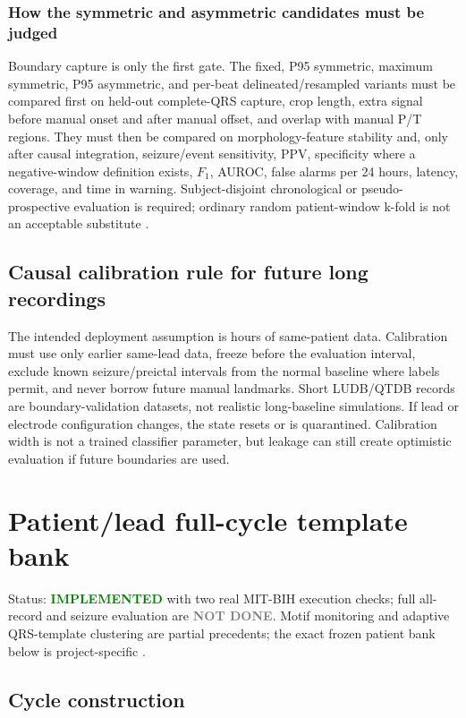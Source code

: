 \documentclass[11pt,a4paper]{article}
\newcommand{\implemented}{\textcolor{green}{\textbf{IMPLEMENTED}}}
\newcommand{\notdone}{\textcolor{gray}{\textbf{NOT DONE}}}
\begin{document}
\subsubsection{How the symmetric and asymmetric candidates must be judged}

Boundary capture is only the first gate. The fixed, P95 symmetric, maximum
symmetric, P95 asymmetric, and per-beat delineated/resampled variants must be
compared first on held-out complete-QRS capture, crop length, extra signal
before manual onset and after manual offset, and overlap with manual P/T
regions. They must then be compared on morphology-feature stability and, only
after causal integration, seizure/event sensitivity, PPV, specificity where a
negative-window definition exists, $F_1$, AUROC, false alarms per 24 hours,
latency, coverage, and time in warning. Subject-disjoint chronological or
pseudo-prospective evaluation is required; ordinary random patient-window
k-fold is not an acceptable substitute \cite{kalousios,seizeit22025}.

\subsection{Causal calibration rule for future long recordings}

The intended deployment assumption is hours of same-patient data. Calibration must use only earlier same-lead data, freeze before the evaluation interval, exclude known seizure/preictal intervals from the normal baseline where labels permit, and never borrow future manual landmarks. Short LUDB/QTDB records are boundary-validation datasets, not realistic long-baseline simulations. If lead or electrode configuration changes, the state resets or is quarantined. Calibration width is not a trained classifier parameter, but leakage can still create optimistic evaluation if future boundaries are used.

\section{Patient/lead full-cycle template bank}
\label{sec:template}

Status: \implemented{} with two real MIT-BIH execution checks; full all-record and seizure evaluation are \notdone. Motif monitoring and adaptive QRS-template clustering are partial precedents; the exact frozen patient bank below is project-specific \cite{motif2026,adaptiveqrs}.

\subsection{Cycle construction}
\end{document}
